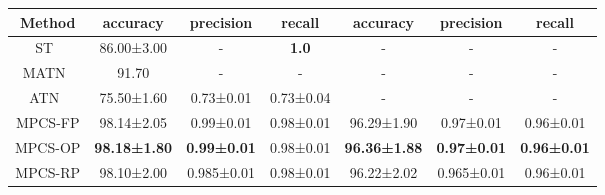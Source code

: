 \documentclass[conference]{IEEEtran}
\begin{document}
\begin{table}[t]
{\begin{tabular}{c|cccccc}
\multirow{-2}{*}{Method} & accuracy                                   & precision                                 & \multicolumn{1}{c|}{recall}                           & accuracy                                   & precision                                 & recall                                    \\ \hline
ST~\cite{rezaeilouyeh2016microscopic}                       & {\color[HTML]{1E1E1E} 86.00±3.00}          & {\color[HTML]{1E1E1E} -}                  & \multicolumn{1}{c|}{\textbf{1.0}}                     & {\color[HTML]{1E1E1E} -}                   & {\color[HTML]{1E1E1E} -}                  & -                                         \\
MATN~\cite{konstantinov2022multi}                     & {\color[HTML]{1E1E1E} 91.70}               & {\color[HTML]{1E1E1E} -}                  & \multicolumn{1}{c|}{-}                                & {\color[HTML]{1E1E1E} -}                   & {\color[HTML]{1E1E1E} -}                  & -                                         \\
ATN~\cite{ilse2018attention}                      & {\color[HTML]{1E1E1E} 75.50±1.60}          & {\color[HTML]{1E1E1E} 0.73±0.01}          & \multicolumn{1}{c|}{{\color[HTML]{1E1E1E} 0.73±0.04}} & -                                          & -                                         & -                                         \\ \hline
MPCS-FP                  & {\color[HTML]{1E1E1E} 98.14±2.05}          & {\color[HTML]{1E1E1E} 0.99±0.01}          & \multicolumn{1}{c|}{{\color[HTML]{1E1E1E} 0.98±0.01}} & {\color[HTML]{1E1E1E} 96.29±1.90}          & {\color[HTML]{1E1E1E} 0.97±0.01}          & {\color[HTML]{1E1E1E} 0.96±0.01}          \\
MPCS-OP                  & {\color[HTML]{1E1E1E} \textbf{98.18±1.80}} & {\color[HTML]{1E1E1E} \textbf{0.99±0.01}} & \multicolumn{1}{c|}{{\color[HTML]{1E1E1E} 0.98±0.01}} & {\color[HTML]{1E1E1E} \textbf{96.36±1.88}} & {\color[HTML]{1E1E1E} \textbf{0.97±0.01}} & {\color[HTML]{1E1E1E} \textbf{0.96±0.01}} \\
MPCS-RP                  & {\color[HTML]{1E1E1E} 98.10±2.00}          & {\color[HTML]{1E1E1E} 0.985±0.01}         & \multicolumn{1}{c|}{{\color[HTML]{1E1E1E} 0.98±0.01}} & {\color[HTML]{1E1E1E} 96.22±2.02}          & {\color[HTML]{1E1E1E} 0.965±0.01}         & {\color[HTML]{1E1E1E} 0.96±0.01}          \\ \hline
\end{tabular}}
\end{table} 
\end{document}
